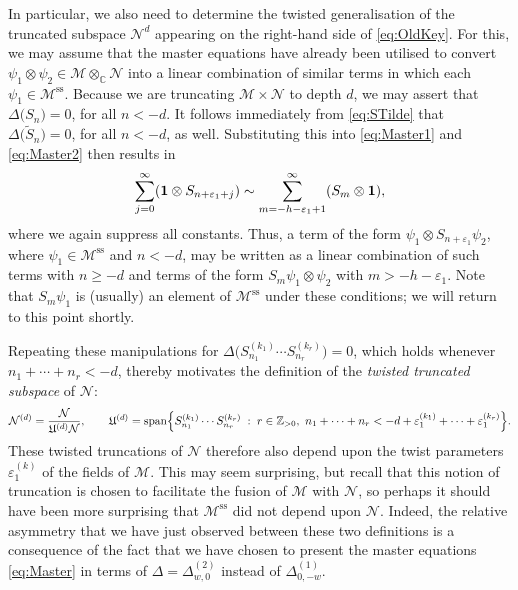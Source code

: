 \documentclass[a4paper,reqno,12pt]{report}
\theoremstyle{definition}
\numberwithin{equation}{section}
\let\originalleft\left     %
\let\originalright\right
\renewcommand{\left}{\mathopen{}\mathclose\bgroup\originalleft}
\renewcommand{\right}{\aftergroup\egroup\originalright}
\newcommand{\alg}[1]{\mathfrak{#1}} %
\newcommand{\brac}[1]{\left( #1 \right)}
\newcommand{\set}[1]{\left\{ #1 \right\}}
\newcommand{\st}{\mspace{5mu} : \mspace{5mu}} %
\newcommand{\ZZ}{\mathbb{Z}}
\newcommand{\CC}{\mathbb{C}}
\newcommand{\wun}{\mathbf{1}}  %
\newcommand{\spsub}[1]{#1^{\text{ss}}}       %
\newcommand{\fuse}{\mathbin{\times}}                                            %
\newcommand{\coproductsymb}{\Delta}                                                %
\newcommand{\coproduct}[1]{\coproductsymb \bigl( #1 \bigr)}                        %
\newcommand{\Ncoproductsymb}[1]{\coproductsymb^{(#1)}}                             %
\newcommand{\parNcoproductsymb}[2]{\Ncoproductsymb{#1}_{#2}}                       %
\newcommand{\rhs}{right-hand side}
\newcommand{\eps}{\varepsilon}
\newcommand{\tS}{\widetilde{S}}
\DeclareMathOperator{\vspn}{span}
\renewcommand{\ge}{\geqslant}
\theoremstyle{plain}
\newcommand{\Mod}[1]{\mathcal{#1}}                 %
\begin{document}
In particular, we also need to determine the twisted generalisation of the truncated subspace $\Mod{N}^d$ appearing on the \rhs{} of \eqref{eq:OldKey}.  For this, we may assume that the master equations have already been utilised to convert $\psi_1 \otimes \psi_2 \in \Mod{M} \otimes_{\CC} \Mod{N}$ into a linear combination of similar terms in which each $\psi_1 \in \spsub{\Mod{M}}$.  Because we are truncating $\Mod{M} \fuse \Mod{N}$ to depth $d$, we may assert that $\coproduct{S_n} = 0$, for all $n<-d$.  It follows immediately from \eqref{eq:STilde} that $\coproduct{\tS_n} = 0$, for all $n<-d$, as well.  Substituting this into \eqref{eq:Master1} and \eqref{eq:Master2} then results in
\begin{equation}
\sum_{j=0}^{\infty} \brac{\wun \otimes S_{n+\eps_1+j}} \sim \sum_{m=-h-\eps_1+1}^{\infty} \brac{S_m \otimes \wun},
\end{equation}
where we again suppress all constants.  Thus, a term of the form $\psi_1 \otimes S_{n+\eps_1} \psi_2$, where $\psi_1 \in \spsub{\Mod{M}}$ and $n<-d$, may be written as a linear combination of such terms with $n \ge -d$ and terms of the form $S_m \psi_1 \otimes \psi_2$ with $m>-h-\eps_1$.  Note that $S_m \psi_1$ is (usually) an element of $\spsub{\Mod{M}}$ under these conditions; we will return to this point shortly.

Repeating these manipulations for $\coproduct{S_{n_1}^{(k_1)} \cdots S_{n_r}^{(k_r)}} = 0$, which holds whenever $n_1 + \cdots + n_r < -d$, thereby motivates the definition of the \emph{twisted truncated subspace} of $\Mod{N}$:
\begin{equation}
\Mod{N}^{(d)} = \frac{\Mod{N}}{\alg{U}^{(d)} \Mod{N}}, \qquad \alg{U}^{(d)} = \vspn \set{S^{(k_1)}_{n_1} \cdots S^{(k_r)}_{n_r} \st r \in \ZZ_{>0}, \ n_1 + \cdots + n_r < -d + \eps_1^{(k_1)} + \cdots + \eps_1^{(k_r)}}.
\end{equation}
These twisted truncations of $\Mod{N}$ therefore also depend upon the twist parameters $\eps_1^{(k)}$ of the fields of $\Mod{M}$.  This may seem surprising, but recall that this notion of truncation is chosen to facilitate the fusion of $\Mod{M}$ with $\Mod{N}$, so perhaps it should have been more surprising that $\spsub{\Mod{M}}$ did not depend upon $\Mod{N}$.  Indeed, the relative asymmetry that we have just observed between these two definitions is a consequence of the fact that we have chosen to present the master equations \eqref{eq:Master} in terms of $\coproductsymb = \parNcoproductsymb{2}{w,0}$ instead of $\parNcoproductsymb{1}{0,-w}$.
\end{document}
